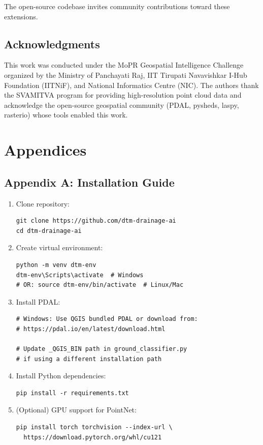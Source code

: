 \documentclass[a4paper,12pt]{article}
\begin{document}
The open-source codebase invites community contributions toward these extensions.

\subsection{Acknowledgments}

This work was conducted under the MoPR Geospatial Intelligence Challenge organized by the Ministry of Panchayati Raj, IIT Tirupati Navavishkar I-Hub Foundation (IITNiF), and National Informatics Centre (NIC). The authors thank the SVAMITVA program for providing high-resolution point cloud data and acknowledge the open-source geospatial community (PDAL, pysheds, laspy, rasterio) whose tools enabled this work.

\newpage

\section{Appendices}

\subsection{Appendix A: Installation Guide}

\begin{enumerate}
	\item Clone repository:
	      \begin{verbatim}
git clone https://github.com/dtm-drainage-ai
cd dtm-drainage-ai
    \end{verbatim}

	\item Create virtual environment:
	      \begin{verbatim}
python -m venv dtm-env
dtm-env\Scripts\activate  # Windows
# OR: source dtm-env/bin/activate  # Linux/Mac
    \end{verbatim}

	\item Install PDAL:
	      \begin{verbatim}
# Windows: Use QGIS bundled PDAL or download from:
# https://pdal.io/en/latest/download.html

# Update _QGIS_BIN path in ground_classifier.py 
# if using a different installation path
    \end{verbatim}

	\item Install Python dependencies:
	      \begin{verbatim}
pip install -r requirements.txt
    \end{verbatim}

	\item (Optional) GPU support for PointNet:
	      \begin{verbatim}
pip install torch torchvision --index-url \
  https://download.pytorch.org/whl/cu121
    \end{verbatim}
\end{enumerate}
\end{document}
